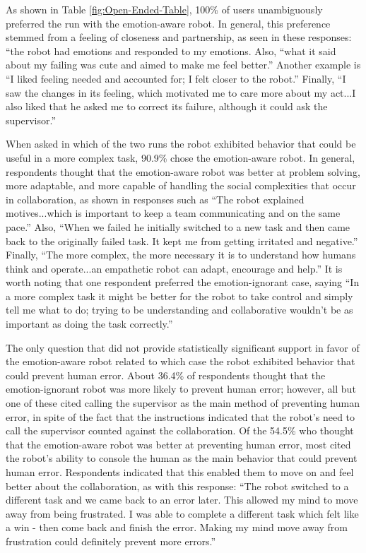 \documentclass[12pt]{report}
\begin{document}
As shown in Table \ref{fig:Open-Ended-Table}, 100\% of users unambiguously
preferred the run with the emotion-aware robot. In general, this preference
stemmed from a feeling of closeness and partnership, as seen in these responses:
``the robot had emotions and responded to my emotions. Also, ``what it said about
my failing was cute and aimed to make me feel better.'' Another example is ``I
liked feeling needed and accounted for; I felt closer to the robot.'' Finally,
``I saw the changes in its feeling, which motivated me to care more about my
act...I also liked that he asked me to correct its failure, although it could
ask the supervisor.''  

When asked in which of the two runs the robot exhibited behavior that could be
useful in a more complex task, 90.9\% chose the emotion-aware robot. In general,
respondents thought that the emotion-aware robot was better at problem solving,
more adaptable, and more capable of handling the social complexities that occur
in collaboration, as shown in responses such as ``The robot explained
motives...which is important to keep a team communicating and on the same
pace.'' Also, ``When we failed he initially switched to a new task and then came
back to the originally failed task. It kept me from getting irritated and
negative.'' Finally, ``The more complex, the more necessary it is to understand
how humans think and operate...an empathetic robot can adapt, encourage and
help.'' It is worth noting that one respondent preferred the emotion-ignorant
case, saying ``In a more complex task it might be better for the robot to take
control and simply tell me what to do; trying to be understanding and
collaborative wouldn't be as important as doing the task correctly.''

The only question that did not provide statistically significant support in
favor of the emotion-aware robot related to which case the robot exhibited
behavior that could prevent human error. About 36.4\% of respondents thought
that the emotion-ignorant robot was more likely to prevent human error; however, all
but one of these cited calling the supervisor as the main method of preventing
human error, in spite of the fact that the instructions indicated that the
robot's need to call the supervisor counted against the collaboration. Of the
54.5\% who thought that the emotion-aware robot was better at preventing human
error, most cited the robot's ability to console the human as the main behavior
that could prevent human error. Respondents indicated that this enabled them to
move on and feel better about the collaboration, as with this response: ``The
robot switched to a different task and we came back to an error later. This
allowed my mind to move away from being frustrated. I was able to complete a
different task which felt like a win - then come back and finish the error.
Making my mind move away from frustration could definitely prevent more
errors.''
\end{document}

